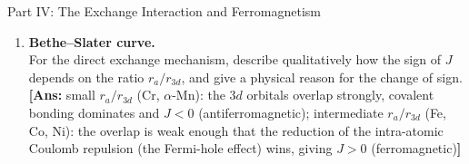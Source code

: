 \documentclass[11pt,a4paper]{article}
\begin{document}
\begin{assignmentbox}{Part IV: The Exchange Interaction and Ferromagnetism}
\begin{enumerate}[label=\textbf{IV.\arabic*.}, leftmargin=*]
    \item \textbf{Bethe--Slater curve.}\\
    For the direct exchange mechanism, describe qualitatively how the sign of $J$ depends on the ratio $r_a/r_{3d}$, and give a physical reason for the change of sign.
    \textbf{[Ans:} small $r_a/r_{3d}$ (Cr, $\alpha$-Mn): the $3d$ orbitals overlap strongly, covalent bonding dominates and $J < 0$ (antiferromagnetic); intermediate $r_a/r_{3d}$ (Fe, Co, Ni): the overlap is weak enough that the reduction of the intra-atomic Coulomb repulsion (the Fermi-hole effect) wins, giving $J > 0$ (ferromagnetic)\textbf{]}

\end{enumerate}
\end{assignmentbox}

\end{document}
